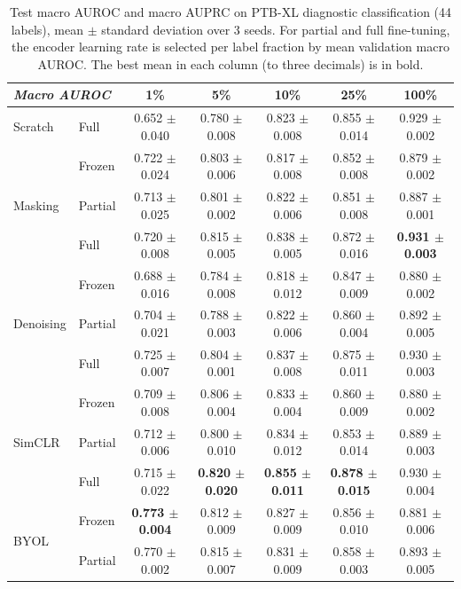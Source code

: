 \begin{table}[t]
\centering
\caption{Test macro AUROC and macro AUPRC on PTB-XL diagnostic classification (44 labels), mean $\pm$ standard deviation over 3 seeds. For partial and full fine-tuning, the encoder learning rate is selected per label fraction by mean validation macro AUROC. The best mean in each column (to three decimals) is in bold.}
\label{tab:results}
\begin{tabular}{llccccc}
\toprule
\multicolumn{2}{l}{\textit{Macro AUROC}} & 1\% & 5\% & 10\% & 25\% & 100\% \\
\midrule
Scratch & Full & 0.652 $\pm$ 0.040 & 0.780 $\pm$ 0.008 & 0.823 $\pm$ 0.008 & 0.855 $\pm$ 0.014 & 0.929 $\pm$ 0.002 \\
\midrule
\multirow{3}{*}{Masking} & Frozen & 0.722 $\pm$ 0.024 & 0.803 $\pm$ 0.006 & 0.817 $\pm$ 0.008 & 0.852 $\pm$ 0.008 & 0.879 $\pm$ 0.002 \\
 & Partial & 0.713 $\pm$ 0.025 & 0.801 $\pm$ 0.002 & 0.822 $\pm$ 0.006 & 0.851 $\pm$ 0.008 & 0.887 $\pm$ 0.001 \\
 & Full & 0.720 $\pm$ 0.008 & 0.815 $\pm$ 0.005 & 0.838 $\pm$ 0.005 & 0.872 $\pm$ 0.016 & \textbf{0.931 $\pm$ 0.003} \\
\midrule
\multirow{3}{*}{Denoising} & Frozen & 0.688 $\pm$ 0.016 & 0.784 $\pm$ 0.008 & 0.818 $\pm$ 0.012 & 0.847 $\pm$ 0.009 & 0.880 $\pm$ 0.002 \\
 & Partial & 0.704 $\pm$ 0.021 & 0.788 $\pm$ 0.003 & 0.822 $\pm$ 0.006 & 0.860 $\pm$ 0.004 & 0.892 $\pm$ 0.005 \\
 & Full & 0.725 $\pm$ 0.007 & 0.804 $\pm$ 0.001 & 0.837 $\pm$ 0.008 & 0.875 $\pm$ 0.011 & 0.930 $\pm$ 0.003 \\
\midrule
\multirow{3}{*}{SimCLR} & Frozen & 0.709 $\pm$ 0.008 & 0.806 $\pm$ 0.004 & 0.833 $\pm$ 0.004 & 0.860 $\pm$ 0.009 & 0.880 $\pm$ 0.002 \\
 & Partial & 0.712 $\pm$ 0.006 & 0.800 $\pm$ 0.010 & 0.834 $\pm$ 0.012 & 0.853 $\pm$ 0.014 & 0.889 $\pm$ 0.003 \\
 & Full & 0.715 $\pm$ 0.022 & \textbf{0.820 $\pm$ 0.020} & \textbf{0.855 $\pm$ 0.011} & \textbf{0.878 $\pm$ 0.015} & 0.930 $\pm$ 0.004 \\
\midrule
\multirow{3}{*}{BYOL} & Frozen & \textbf{0.773 $\pm$ 0.004} & 0.812 $\pm$ 0.009 & 0.827 $\pm$ 0.009 & 0.856 $\pm$ 0.010 & 0.881 $\pm$ 0.006 \\
 & Partial & 0.770 $\pm$ 0.002 & 0.815 $\pm$ 0.007 & 0.831 $\pm$ 0.009 & 0.858 $\pm$ 0.003 & 0.893 $\pm$ 0.005 \\

\end{tabular}
\end{table}
